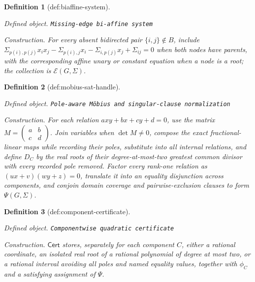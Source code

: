 \documentclass{article}
\newtheorem{definition}{Definition}
\begin{document}
\begin{definition}[def:biaffine-system]\label{def:biaffine-system}
\par\smallskip\noindent\emph{Defined object.} \texttt{Missing-\allowbreak{}edge bi-\allowbreak{}affine system}
\par\smallskip\noindent\emph{Construction.} For every absent bidirected pair \(\{i,j\}\notin B\), include \(\Sigma_{p(i),p(j)}x_i x_j-\Sigma_{p(i),j}x_i-\Sigma_{i,p(j)}x_j+\Sigma_{ij}=0\) when both nodes have parents, with the corresponding affine unary or constant equation when a node is a root; the collection is \(\mathcal E(G,\Sigma)\).
\end{definition}

\begin{definition}[def:mobius-sat-handle]\label{def:mobius-sat-handle}
\par\smallskip\noindent\emph{Defined object.} \texttt{Pole-\allowbreak{}aware Möbius and singular-\allowbreak{}clause normalization}
\par\smallskip\noindent\emph{Construction.} For each relation \(a x y+b x+c y+d=0\), use the matrix \(M=\left(\begin{smallmatrix}a&b\\c&d\end{smallmatrix}\right)\). Join variables when \(\det M\ne0\), compose the exact fractional-linear maps while recording their poles, substitute into all internal relations, and define \(D_C\) by the real roots of their degree-at-most-two greatest common divisor with every recorded pole removed. Factor every rank-one relation as \((u x+v)(w y+z)=0\), translate it into an equality disjunction across components, and conjoin domain coverage and pairwise-exclusion clauses to form \(\Psi(G,\Sigma)\).
\end{definition}

\begin{definition}[def:component-certificate]\label{def:component-certificate}
\par\smallskip\noindent\emph{Defined object.} \texttt{Componentwise quadratic certificate}
\par\smallskip\noindent\emph{Construction.} \(\mathsf{Cert}\) stores, separately for each component \(C\), either a rational coordinate, an isolated real root of a rational polynomial of degree at most two, or a rational interval avoiding all poles and named equality values, together with \(\phi_C\) and a satisfying assignment of \(\Psi\).
\end{definition}
\end{document}
